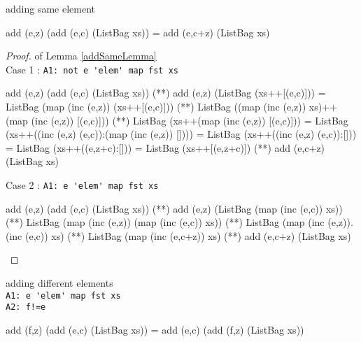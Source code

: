 \begin{lemma}\label{addSameLemma} adding same element
\begin{code}
add (e,z) (add (e,c) (ListBag xs)) = add (e,c+z) (ListBag xs)
\end{code}
\end{lemma}
\begin{proof} of Lemma \ref{addSameLemma}\\
Case 1 : \verb|A1: not e 'elem' map fst xs|
\begin{code}
add (e,z) (add (e,c) (ListBag xs)) 
             (**) add (e,z) (ListBag (xs++[(e,c)]))
             = ListBag (map (inc (e,z)) (xs++[(e,c)]))
             (**) ListBag ((map (inc (e,z)) xs)++(map (inc (e,z)) [(e,c)]))
             (**) ListBag (xs++(map (inc (e,z)) [(e,c)]))
             = ListBag (xs++((inc (e,z) (e,c)):(map (inc (e,z)) [])))
             = ListBag (xs++((inc (e,z) (e,c)):[]))
             = ListBag (xs++((e,z+c):[]))
             = ListBag (xs++[(e,z+c)])
             (**) add (e,c+z) (ListBag xs)
\end{code}
Case 2 : \verb|A1: e 'elem' map fst xs|
\begin{code}
add (e,z) (add (e,c) (ListBag xs)) 
             (**) add (e,z) (ListBag (map (inc (e,c)) xs))
             (**) ListBag (map (inc (e,z)) (map (inc (e,c)) xs))
             (**) ListBag (map (inc (e,z)).(inc (e,c)) xs)
             (**) ListBag (map (inc (e,c+z)) xs)
             (**) add (e,c+z) (ListBag xs)
\end{code}
\end{proof}
\begin{lemma}\label{addDiffLemma}adding different elements\\
\verb|A1: e 'elem' map fst xs|\\
\verb|A2: f!=e|
\begin{code}
add (f,z) (add (e,c) (ListBag xs)) = add (e,c) (add (f,z) (ListBag xs))
\end{code}
\end{lemma}

